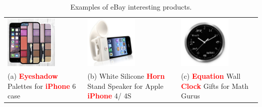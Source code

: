 \begin{table}[t]
\begin{center}
\begin{tabular}{LLL}
\includegraphics[height=2.5cm]{figures/eyeshadow-iphone-case.jpg}&\includegraphics[height=2.5cm]{figures/horn-iphone-speaker.jpg}&\includegraphics[height=2.5cm]{figures/geeky-clock.jpg}\\
(a) \textcolor{red}{{\bf Eyeshadow}} Palettes for \textcolor{red}{{\bf iPhone}} 6 case & (b) White Silicone \textcolor{red}{{\bf Horn}} Stand Speaker for Apple \textcolor{red}{{\bf iPhone}} 4/ 4S& (c) \textcolor{red}{{\bf Equation}} Wall \textcolor{red}{{\bf Clock}} Gifts for Math Gurus\\
\end{tabular}
\end{center}
\caption{Examples of eBay interesting products.}
\label{tab:ebay-interesting-products}
\end{table}